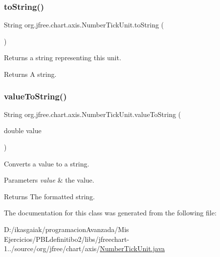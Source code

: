 \subsubsection{\texorpdfstring{to\+String()}{toString()}}
{\footnotesize\ttfamily String org.\+jfree.\+chart.\+axis.\+Number\+Tick\+Unit.\+to\+String (\begin{DoxyParamCaption}{ }\end{DoxyParamCaption})}

Returns a string representing this unit.

\begin{DoxyReturn}{Returns}
A string. 
\end{DoxyReturn}
\mbox{\label{classorg_1_1jfree_1_1chart_1_1axis_1_1_number_tick_unit_ad9f7529de2d9e870d533ed5746d65079}} 
\subsubsection{\texorpdfstring{value\+To\+String()}{valueToString()}}
{\footnotesize\ttfamily String org.\+jfree.\+chart.\+axis.\+Number\+Tick\+Unit.\+value\+To\+String (\begin{DoxyParamCaption}\item[{double}]{value }\end{DoxyParamCaption})}

Converts a value to a string.


\begin{DoxyParams}{Parameters}
{\em value} & the value.\\
\hline
\end{DoxyParams}
\begin{DoxyReturn}{Returns}
The formatted string. 
\end{DoxyReturn}


The documentation for this class was generated from the following file\+:\begin{DoxyCompactItemize}
\item 
D\+:/ikasgaiak/programacion\+Avanzada/\+Mis Ejercicios/\+P\+B\+Ldefinitibo2/libs/jfreechart-\/1../source/org/jfree/chart/axis/\mbox{\hyperlink{_number_tick_unit_8java}{Number\+Tick\+Unit.\+java}}\end{DoxyCompactItemize}
